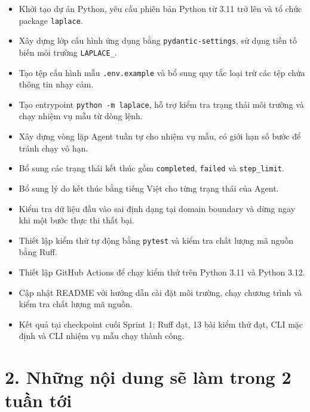 \documentclass[12pt,a4paper]{article}
\begin{document}
\begin{itemize}
    \item Khởi tạo dự án Python, yêu cầu phiên bản Python từ 3.11 trở lên và tổ chức package \texttt{laplace}.

    \item Xây dựng lớp cấu hình ứng dụng bằng \texttt{pydantic-settings}, sử dụng tiền tố biến môi trường \texttt{LAPLACE\_}.

    \item Tạo tệp cấu hình mẫu \texttt{.env.example} và bổ sung quy tắc loại trừ các tệp chứa thông tin nhạy cảm.

    \item Tạo entrypoint \texttt{python -m laplace}, hỗ trợ kiểm tra trạng thái môi trường và chạy nhiệm vụ mẫu từ dòng lệnh.

    \item Xây dựng vòng lặp Agent tuần tự cho nhiệm vụ mẫu, có giới hạn số bước để tránh chạy vô hạn.

    \item Bổ sung các trạng thái kết thúc gồm \texttt{completed}, \texttt{failed} và \texttt{step\_limit}.

    \item Bổ sung lý do kết thúc bằng tiếng Việt cho từng trạng thái của Agent.

    \item Kiểm tra dữ liệu đầu vào sai định dạng tại domain boundary và dừng ngay khi một bước thực thi thất bại.

    \item Thiết lập kiểm thử tự động bằng \texttt{pytest} và kiểm tra chất lượng mã nguồn bằng Ruff.

    \item Thiết lập GitHub Actions để chạy kiểm thử trên Python 3.11 và Python 3.12.

    \item Cập nhật README với hướng dẫn cài đặt môi trường, chạy chương trình và kiểm tra chất lượng mã nguồn.

    \item Kết quả tại checkpoint cuối Sprint 1: Ruff đạt, 13 bài kiểm thử đạt, CLI mặc định và CLI nhiệm vụ mẫu chạy thành công.
\end{itemize}

\section*{2. Những nội dung sẽ làm trong 2 tuần tới}
\end{document}
